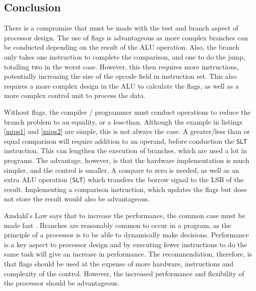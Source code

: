 \documentclass[12pt,a4paper]{article}
\begin{document}
\begin{bibunit}[is-unsrt]
\section{Conclusion}

There is a compromise that must be made with the test and branch aspect of processor design.
The use of flags is advantageous as more complex branches can be conducted depending on the result of the ALU operation.
Also, the branch only takes one instruction to complete the comparison, and one to do the jump, totalling two in the worst case.
However, this then requires more instructions, potentially increasing the size of the opcode field in instruction set.
This also requires a more complex design in the ALU to calculate the flags, as well as a more complex control unit to process the data.

Without flags, the compiler / programmer must conduct operations to reduce the branch problem to an equality, or a less-than. 
Although the example in listings \ref{mips1} and \ref{mips2} are simple, this is not always the case. 
A greater/less than or equal comparison will require addition to an operand, before conduction the \texttt{SLT} instruction.
This can lengthen the execution of branches, which are used a lot in programs.
The advantage, however, is that the hardware implementation is much simpler, and the control is smaller.
A compare to zero is needed, as well as an extra ALU operation (\texttt{SLT}) which transfers the borrow signal to the LSB of the result. 
Implementing a comparison instruction, which updates the flags but does not store the result would also be advantageous. 


Amdahl's Law says that to increase the performance, the common case must be made fast \cite{amdahl}.
Branches are reasonably common to occur in a program, as the principle of a processor is to be able to dynamically make decisions. 
Performance is a key aspect to processor design and by executing fewer instructions to do the same task will give an increase in performance.
The recommendation, therefore, is that flags should be used at the expense of more hardware, instructions and complexity of the control.
However, the increased performance and flexibility of the processor should be advantageous.

\clearpage
\putbib[references]
\end{bibunit}
\end{document}
